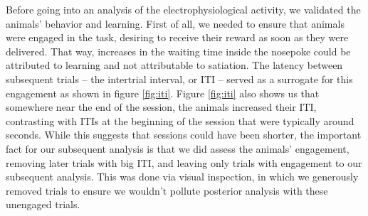     Before going into an analysis of the electrophysiological activity, we validated the animals' behavior and learning. First of all, we needed to ensure that animals were engaged in the task, desiring to receive their reward as soon as they were delivered. That way, increases in the waiting time inside the nosepoke could be attributed to learning and not attributable to satiation. The latency between subsequent trials -- the intertrial interval, or ITI --  served as a surrogate for this engagement as shown in figure \ref{fig:iti}. 
    Figure \ref{fig:iti} also shows us that somewhere near the end of the session, the animals increased their ITI, contrasting with ITIs at the beginning of the session that were typically around seconds. While this suggests that sessions could have been shorter, the important fact for our subsequent analysis is that we did assess the animals' engagement, removing later trials with big ITI, and leaving only trials with engagement to our subsequent analysis. This was done via visual inspection, in which we generously removed trials to ensure we wouldn't pollute posterior analysis with these unengaged trials.
